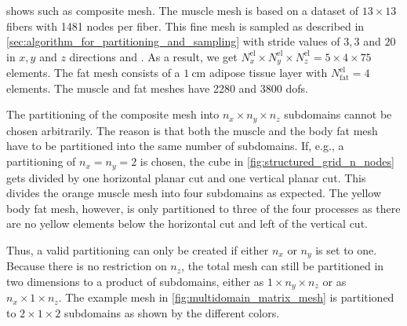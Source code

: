  shows such as composite mesh.
The muscle mesh is based on a dataset of $13\times 13$ fibers with \num{1481} nodes per fiber. This fine mesh is sampled as described in \cref{sec:algorithm_for_partitioning_and_sampling} with stride values of $3,3$ and $20$ in $x,y$ and $z$ directions and . As a result, we get $N_x^\text{el} \times N_y^\text{el} \times N_z^\text{el} = 5 \times 4 \times 75$ elements.
The fat mesh consists of a $\SI{1}{\centi\meter}$ adipose tissue layer with $N_\text{fat}^\text{el}=4$ elements. The muscle and fat meshes have \num{2280} and \num{3800} dofs.

The partitioning of the composite mesh into $n_x \times n_y \times n_z$ subdomains cannot be chosen arbitrarily. The reason is that both the muscle and the body fat mesh have to be partitioned into the same number of subdomains. 
If, e.g., a partitioning of $n_x=n_y=2$ is chosen, the cube in \cref{fig:structured_grid_n_nodes} gets divided by one horizontal planar cut and one vertical planar cut. This divides the orange muscle mesh into four subdomains as expected. The yellow body fat mesh, however, is only partitioned to three of the four processes as there are no yellow elements below the horizontal cut and left of the vertical cut.

Thus, a valid partitioning can only be created if either $n_x$ or $n_y$ is set to one. Because there is no restriction on $n_z$, the total mesh can still be partitioned in two dimensions to a product of subdomains, either as $1 \times n_y \times n_z$ or as $n_x \times 1 \times n_z$.
The example mesh in \cref{fig:multidomain_matrix_mesh} is partitioned to $2 \times 1 \times 2$ subdomains as shown by the different colors.

